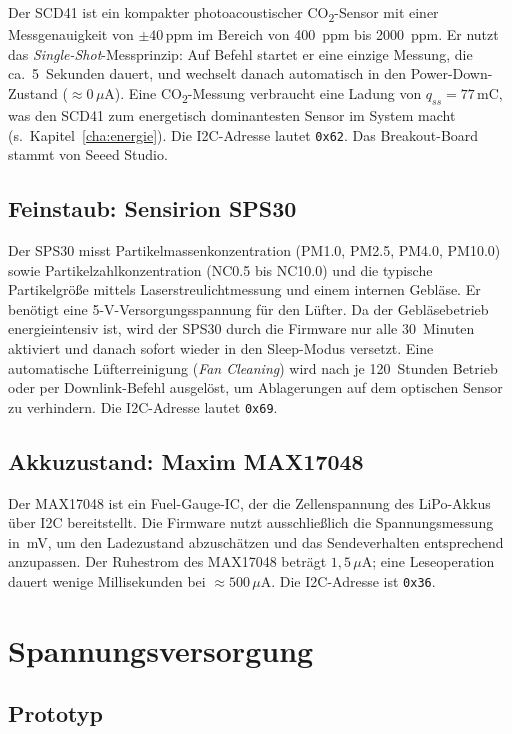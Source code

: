 Der SCD41 ist ein kompakter photoacoustischer CO\textsubscript{2}-Sensor mit einer Messgenauigkeit von $\pm 40\,\text{ppm}$ im Bereich von 400~ppm bis 2000~ppm. Er nutzt das \textit{Single-Shot}-Messprinzip: Auf Befehl startet er eine einzige Messung, die ca.\ 5~Sekunden dauert, und wechselt danach automatisch in den Power-Down-Zustand ($\approx 0\,\mu\text{A}$). Eine CO\textsubscript{2}-Messung verbraucht eine Ladung von $q_{ss} = 77\,\text{mC}$, was den SCD41 zum energetisch dominantesten Sensor im System macht (s.\ Kapitel~\ref{cha:energie}). Die I2C-Adresse lautet \texttt{0x62}. Das Breakout-Board stammt von Seeed Studio.

\subsection*{Feinstaub: Sensirion SPS30}

Der SPS30 misst Partikelmassenkonzentration (PM1.0, PM2.5, PM4.0, PM10.0) sowie Partikelzahlkonzentration (NC0.5 bis NC10.0) und die typische Partikelgröße mittels Laserstreulichtmessung und einem internen Gebläse. Er benötigt eine 5-V-Versorgungsspannung für den Lüfter. Da der Gebläsebetrieb energieintensiv ist, wird der SPS30 durch die Firmware nur alle 30~Minuten aktiviert und danach sofort wieder in den Sleep-Modus versetzt. Eine automatische Lüfterreinigung (\textit{Fan Cleaning}) wird nach je 120~Stunden Betrieb oder per Downlink-Befehl ausgelöst, um Ablagerungen auf dem optischen Sensor zu verhindern. Die I2C-Adresse lautet \texttt{0x69}.

\subsection*{Akkuzustand: Maxim MAX17048}

Der MAX17048 ist ein Fuel-Gauge-IC, der die Zellenspannung des LiPo-Akkus über I2C bereitstellt. Die Firmware nutzt ausschließlich die Spannungsmessung in~mV, um den Ladezustand abzuschätzen und das Sendeverhalten entsprechend anzupassen. Der Ruhestrom des MAX17048 beträgt $1{,}5\,\mu\text{A}$; eine Leseoperation dauert wenige Millisekunden bei $\approx 500\,\mu\text{A}$. Die I2C-Adresse ist \texttt{0x36}.

\newpage

\section*{Spannungsversorgung}

\subsection*{Prototyp}

